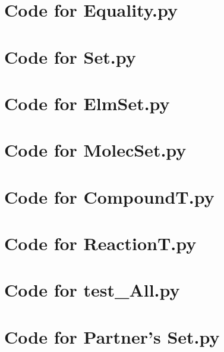 \documentclass[12pt]{article}
\begin{document}
\section{Code for Equality.py}

\noindent 

\newpage

\section{Code for Set.py}

\noindent 

\newpage

\section{Code for ElmSet.py}

\noindent 

\newpage

\section{Code for MolecSet.py}

\noindent 

\newpage

\section{Code for CompoundT.py}

\noindent 

\newpage

\section{Code for ReactionT.py}

\noindent 

\newpage

\section{Code for test\_All.py}

\noindent 

\newpage

\section{Code for Partner's Set.py}
\end{document}
